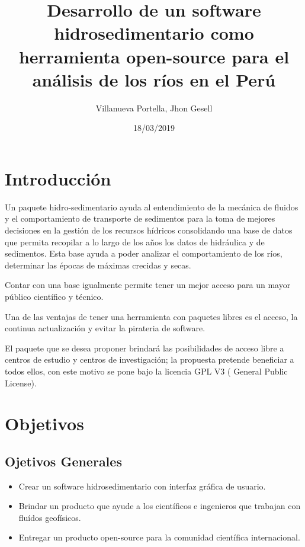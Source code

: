 \documentclass[12pt,a4paper]{report}
\begin{document}
\title{Desarrollo de un software hidrosedimentario como herramienta open-source para el análisis de los ríos en el Perú}
\author{Villanueva Portella, Jhon Gesell}
\date{18/03/2019}
\maketitle

\section{Introducción}
Un paquete hidro-sedimentario ayuda al entendimiento de la mecánica de fluidos y el comportamiento de transporte de sedimentos para la toma de mejores decisiones en la gestión de los recursos hídricos consolidando una base de datos que permita recopilar a lo largo de los años los datos de hidráulica y de sedimentos. Esta base ayuda a poder analizar el comportamiento de los ríos, determinar las épocas de máximas crecidas y secas.

Contar con una base igualmente permite tener un mejor acceso para un mayor público científico y técnico.

Una de las ventajas de tener una herramienta con paquetes libres es el acceso, la continua actualización y evitar la pirateria de software.

El paquete que se desea proponer brindará las posibilidades de acceso libre a centros de estudio y centros de investigación; la propuesta pretende beneficiar a todos ellos, con este motivo se pone bajo la licencia GPL V3 ( General Public License).
\section{Objetivos}
	\subsection{Ojetivos Generales}
	\begin{itemize}
	\item Crear un software hidrosedimentario con interfaz gráfica de usuario.
	\item Brindar un producto que ayude a los científicos e ingenieros que trabajan con fluídos geofísicos.
	\item Entregar un producto open-source para la comunidad científica internacional.
	\end{itemize}
\end{document}
